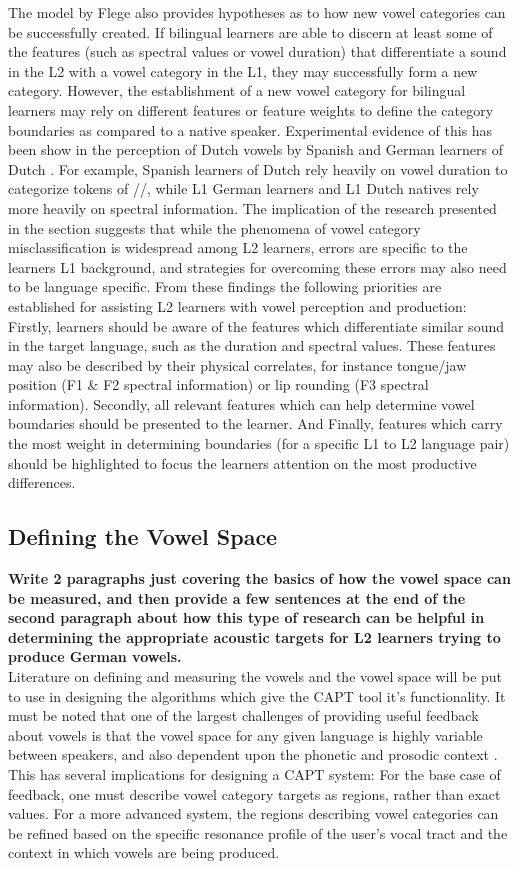The model by Flege also provides hypotheses as to how new vowel categories can be successfully created. If bilingual learners are able to discern at least some of the features (such as spectral values or vowel duration) that differentiate a sound in the L2 with a vowel category in the L1, they may successfully form a new category. However, the establishment of a new vowel category for bilingual learners may rely on different features or feature weights to define the category boundaries as compared to a native speaker. Experimental evidence of this has been show in the perception of Dutch vowels by Spanish and German learners of Dutch \cite{escudero2009native}. For example, Spanish learners of Dutch rely heavily on vowel duration to categorize tokens of //, while L1 German learners and L1 Dutch natives rely more heavily on spectral information. The implication of the research presented in the section suggests that while the phenomena of vowel category misclassification is widespread among L2 learners, errors are specific to the learners L1 background, and strategies for overcoming these errors may also need to be language specific. From these findings the following priorities are established for assisting L2 learners with vowel perception and production:  Firstly, learners should be aware of the features which differentiate similar sound in the target language, such as the duration and spectral values. These features may also be described by their physical correlates, for instance tongue/jaw position (F1 \& F2 spectral information) or lip rounding (F3 spectral information).  Secondly, all relevant features which can help determine vowel boundaries should be presented to the learner.  And Finally, features which carry the most weight in determining boundaries (for a specific L1 to L2 language pair) should be highlighted to focus the learners attention on the most productive differences. 

\subsection{Defining the Vowel Space}
 \textbf{Write 2 paragraphs just covering the basics of how the vowel space can be measured, and then provide a few sentences at the end of the second paragraph about how this type of research can be helpful in determining the appropriate acoustic targets for L2 learners trying to produce German vowels.}
 \\
Literature on defining and measuring the vowels and the vowel space will be put to use in designing the algorithms which give the CAPT tool it's functionality. It must be noted that one of the largest challenges of providing useful feedback about vowels is that the vowel space for any given language is highly variable between speakers, and also dependent upon the phonetic and prosodic context \citep{Jongman, Gendrot}. This has several implications for designing a CAPT system: For the base case of feedback, one must describe vowel category targets as regions, rather than exact values.  For a more advanced system, the regions describing vowel categories can be refined based on the specific resonance profile of the user's vocal tract and the context in which vowels are being produced.

